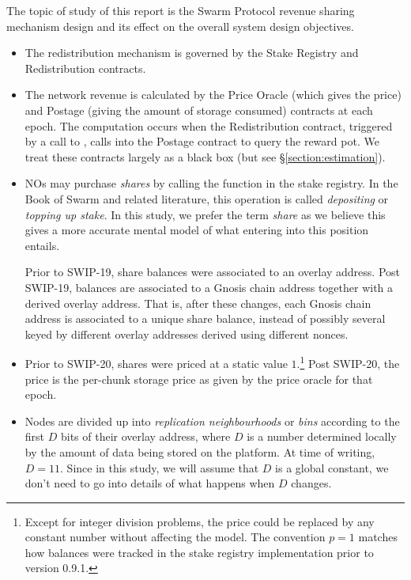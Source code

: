 The topic of study of this report is the Swarm Protocol revenue sharing mechanism design and its effect on the overall system design objectives.
%
\begin{itemize}
  \item 
    The redistribution mechanism is governed by the Stake Registry and Redistribution contracts.
  \item 
    The network revenue is calculated by the Price Oracle (which gives the price) and Postage (giving the amount of storage consumed) contracts at each epoch.
    The computation occurs when the Redistribution contract, triggered by a call to , calls into the Postage contract to query the reward pot.
    We treat these contracts largely as a black box (but see \S\ref{section:estimation}).
  
    \item 
    NOs may purchase \emph{shares} by calling the  function in the stake registry.
    In the Book of Swarm and related literature, this operation is called \emph{depositing} or \emph{topping up stake}.
    In this study, we prefer the term \emph{share} as we believe this gives a more accurate mental model of what entering into this position entails.

    Prior to SWIP-19, share balances were associated to an overlay address.
    Post SWIP-19, balances are associated to a Gnosis chain address together with a derived overlay address.
    That is, after these changes, each Gnosis chain address is associated to a unique share balance, instead of possibly several keyed by different overlay addresses derived using different nonces.

  \item
    Prior to SWIP-20, shares were priced at a static value $1$.\footnote{Except for integer division problems, the price could be replaced by any constant number without affecting the model.
    The convention $p=1$ matches how balances were tracked in the stake registry implementation prior to version 0.9.1.}
    Post SWIP-20, the price is the per-chunk storage price as given by the price oracle for that epoch.

  \item
    Nodes are divided up into \emph{replication neighbourhoods} or \emph{bins} according to the first $D$ bits of their overlay address, where $D$ is a number determined locally by the amount of data being stored on the platform.
    At time of writing, $D=11$.
    Since in this study, we will assume that $D$ is a global constant, we don't need to go into details of what happens when $D$ changes.


\end{itemize}
